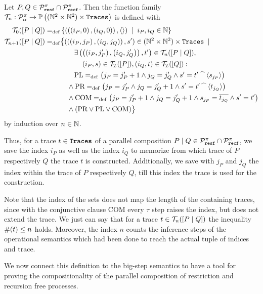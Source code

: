 \begin{definition}
\label{def_idx_trace_sets}
Let $P,Q\in\mathcal P^{\pi}_{\mathtt{resf}}\cap\mathcal P^{\pi}_{\mathtt{recf}}$. Then the function family $\traces_n:\procs_\alpha \rightarrow \pom{(\N^2\times\N^2)\times\tr}$ is defined with
\begin{align*}
	 \tracesI{0}{P}{Q} \define& \set[i_P,i_Q\in\N]{\left(\left(\left(i_P,0\right),\left(i_Q,0\right)\right),\eseq\right)} \\
	 \tracesI{n+1}{P}{Q} \define& \bigl\{\left(\left(\left(i_P,j_P\right),\left(i_Q,j_Q\right)\right),s'\right)\in (\N^2\times\N^2)\times\tr \; \mid \; \\
		& \quad\quad\exists\left(\left(\left(i_P,j_P'\right),\left(i_Q,j_Q'\right)\right),t'\right)\in\tracesI{n}{P}{Q}, \\
		& \quad\quad\quad \left(i_P,s\right)\in\trI{P}, \left(i_Q,t\right)\in\trI{Q}: \\
		& \quad\quad \text{PL}\define\left(j_P=j_P'+1\wedge j_Q=j_Q'\wedge s'=\seqconc{t'}{\seq{s_{j_P}}}\right) \\
		& \quad\wedge \text{PR}\define\left(j_P=j_P'\wedge j_Q=j_Q'+1\wedge s'=\seqconc{t'}{\seq{t_{j_Q}}}\right)  \\
		& \quad\wedge \text{COM}\define\left(j_P=j_P'+1\wedge j_Q=j_Q'+1\wedge s_{j_P}=\conj{t_{j_Q}}\wedge s'=t'\right)\\
		& \quad\wedge \left(\text{PR} \vee \text{PL} \vee \text{COM}\right) \bigr\}
\end{align*}
by induction over $n\in\mathbb N$.
\end{definition}

Thus, for a trace $t\in\mathtt{Traces}$ of a parallel composition $P \mid Q\in\mathcal P^{\pi}_{\mathtt{resf}}\cap\mathcal P^{\pi}_{\mathtt{recf}}$, we save the index $i_P$ as well as the index $i_Q$ to memorize from which trace of $P$ respectively $Q$ the trace $t$ is constructed. Additionally, we save with $j_P$ and $j_Q$ the index within the trace of $P$ respectively $Q$, till this index the trace is used for the construction.

Note that the index of the sets does not map the length of the containing traces, since with the conjunctive clause COM every $\tau$ step raises the index, but does not extend the trace. We just can say that for a trace $t\in\mathcal T_{n}(\left[P \mid Q\right])$ the inequality $\#(t)\leq{}n$ holds. Moreover, the index $n$ counts the inference steps of the operational semantics which had been done to reach the actual tuple of indices and trace.

We now connect this definition to the big-step semantics to have a tool for proving the compositionality of the parallel composition of restriction and recursion free processes.

